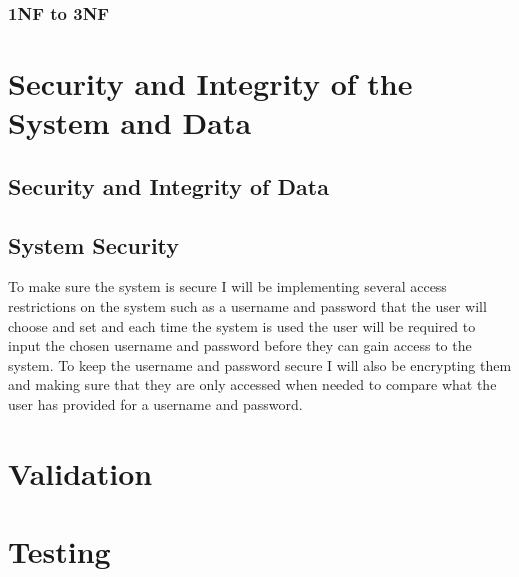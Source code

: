 \subsubsection{1NF to 3NF}

\section{Security and Integrity of the System and Data}

\subsection{Security and Integrity of Data}

\subsection{System Security}
To make sure the system is secure I will be implementing several access restrictions on the system such as a username and password that the user will choose and  set and each time the system is used the user will be required to input the chosen username and password before they can gain access to the system. To keep the username and password secure I will also be encrypting them and making sure that they are only accessed when needed to compare what the user has provided for a username and password.
\section{Validation}

\section{Testing}

